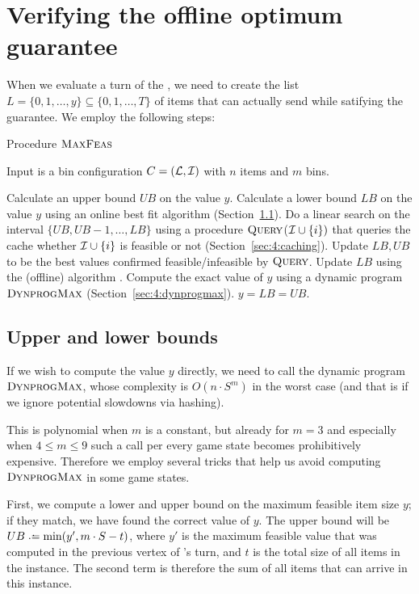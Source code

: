 \section{Verifying the offline optimum guarantee}\label{subsec:test}

When we evaluate a turn of the \adversary, we need to create the list
$L = \{0,1,\ldots,y\} \subseteq \{0,1,\ldots,T\}$ of items that
\adversary can actually send while satifying the \binstretch
guarantee. We employ the following steps:

\begin{algorithm}
\caption{Procedure $\textsc{MaxFeas}$}
\noindent Input is a bin configuration $C = ({\mathcal L},{\mathcal I})$ with $n$ items and $m$ bins.
\begin{algorithmic}[1]
\State Calculate an upper bound $UB$ on the value $y$.
\State Calculate a lower bound $LB$ on the value $y$ using an online best fit algorithm (Section~\ref{sec:4:dynprogbounds}).
\State Do a linear search on the interval $\{UB,UB-1,\ldots,LB\}$
using a procedure $\textsc{Query}$(${\mathcal I} \cup \{i\})$ that queries the cache
whether ${\mathcal I} \cup \{i\}$ is feasible or not (Section~\ref{sec:4:caching}).
\State Update $LB, UB$ to be the best values confirmed feasible/infeasible by $\textsc{Query}$.
\EndIf
{}
\State Update $LB$ using the (offline) algorithm \bfd.
\EndIf
{}
\State Compute the exact value of $y$ using a dynamic program $\textsc{DynprogMax}$ (Section~\ref{sec:4:dynprogmax}).
\EndIf
\State \Return $y = LB = UB$.
\end{algorithmic}
\end{algorithm}

\subsection{Upper and lower bounds}\label{sec:4:dynprogbounds}

If we wish to compute the value $y$ directly, we need to call the
dynamic program $\textsc{DynprogMax}$, whose complexity is $O(n \cdot S^m)$ in
the worst case (and that is if we ignore potential slowdowns via
hashing).

This is polynomial when $m$ is a constant, but already for $m=3$ and
especially when $4 \le m \le 9$ such a call per every game state
becomes prohibitively expensive. Therefore we employ several tricks
that help us avoid computing $\textsc{DynprogMax}$ in some game states.

First, we compute a lower and upper bound on the maximum feasible item
size $y$; if they match, we have found the correct value of $y$.  The
upper bound will be $UB \defeq \min(y', m\cdot S - t)$, where $y'$ is
the maximum feasible value that was computed in the previous vertex of
\adversary's turn, and $t$ is the total size of all items in the
instance. The second term is therefore the sum of all items that can
arrive in this instance.

